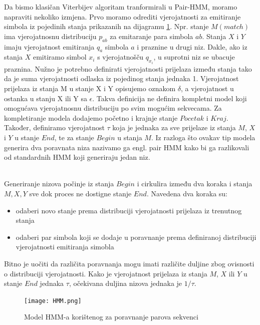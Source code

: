 \documentclass[a4paper]{article}
\begin{document}
Da bismo klasičan Viterbijev algoritam tranformirali u Pair-HMM, moramo napraviti nekoliko izmjena. Prvo moramo odrediti vjerojatnosti za emitiranje simbola iz pojedinih stanja prikazanih na dijagramu \ref{fig:hmm}. Npr. stanje $M (match)$ ima vjerojatnosnu distribuciju $p_{ab}$ za emitaranje para simbola $ab$. Stanja $X$ i $Y$ imaju vjerojatnost emitiranja $q_a$ simbola $a$ i praznine u drugi niz. Dakle, ako iz stanja $X$ emitiramo simbol $x_{i}$ s vjerojatnošču $q_{x_{i}}$, u suprotni niz se ubacuje praznina. Nužno je potrebno definirati vjerojatnosti prijelaza između stanja tako da je suma vjerojatnosti odlaska iz pojedinog stanja jednaka 1. Vjerojatnost prijelaza iz stanja M u stanje X i Y opisujemo oznakom $\delta$, a vjerojatnost u ostanka u stanju X ili Y sa $\epsilon$.
Takva definicija ne definira kompletni model koji omogućava vjerojatnosnu distribuciju po svim mogućim sekvecama. Za kompletiranje modela dodajemo početno i krajnje stanje $Pocetak$ i $Kraj$. Također, definiramo vjerojatnost $\tau$ koja je jednaka za sve prijelaze iz stanja $M$, $X$ i $Y$ u stanje $End$, te za stanje $Begin$ u stanja $M$.
Iz razloga što ovakav tip modela generira dva poravnata niza nazivamo ga engl. pair HMM kako bi ga razlikovali od standardnih HMM koji generiraju jedan niz. 

\noindent
\\
Generiranje nizova počinje iz stanja $Begin$ i cirkulira između dva koraka i stanja ${M,X,Y}$ sve dok proces ne dostigne stanje $End$. Navedena dva koraka su:
\begin{itemize}
    \item odaberi novo stanje prema distribuciji vjerojatnosti prijelaza iz trenutnog stanja
    \item odaberi par simbola koji se dodaje u poravnanje prema definiranoj distribuciji vjerojatnosti emitiranja simobla
\end{itemize}

\noindent
Bitno je uočiti da različita poravnanja mogu imati različite duljine zbog ovisnosti o distribuciji vjerojatnosti. Kako je vjerojatnost prijelaza iz stanja $M$, $X$ ili $Y$ u stanje $End$ jednaka $\tau$, očekivana duljina nizova jednaka je ${1}/{\tau}$.

\begin{figure}[H]
  \texttt{[image: HMM.png]}
  \caption{Model HMM-a korištenog za poravnanje parova sekvenci}
  \label{fig:hmm}
\end{figure}

\noindent
\end{document}
